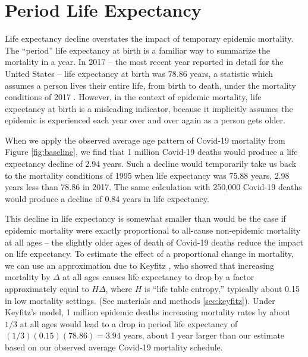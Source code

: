 \documentclass[9pt,twocolumn,twoside,lineno]{pnas-new}
\begin{document}
\section*{Period Life Expectancy}

Life expectancy decline overstates the impact of temporary epidemic
mortality. The ``period'' life expectancy at birth is a familiar way to
summarize the mortality in a year. In 2017 -- the most recent year
reported in detail for the United States -- life expectancy at birth was 78.86
years, a statistic which assumes a person lives their entire life,
from birth to death, under the mortality conditions of 2017
\cite{HMD}. However, in the context of epidemic mortality, life expectancy at
birth is a misleading indicator, because it implicitly assumes the
epidemic is experienced each year over and over again as a person gets
older.

When we apply the observed average age pattern of Covid-19
mortality from Figure \ref{fig:baseline}, we find that 1 million
Covid-19 deaths would produce a life expectancy decline of 2.94 years. 
Such a decline would temporarily take 
us back to the mortality conditions of 1995 when life expectancy was 
75.88 years, 2.98 years less than 78.86 in 2017. The same calculation 
with 250,000 Covid-19 deaths would produce a decline of 0.84 years in life expectancy.

This decline in life expectancy is somewhat smaller than would be the
case if epidemic mortality were exactly proportional to all-cause
non-epidemic mortality at all ages -- the slightly older ages of death
of Covid-19 deaths reduce the impact on life expectancy. To estimate
the effect of a proportional change in mortality, we can use an
approximation due to Keyfitz \cite{keyfitz:1977}, who showed that
increasing mortality by $\Delta$ at all ages causes life expectancy to
drop by a factor approximately equal to $H \Delta $, where $H$ is
``life table entropy,'' typically about 0.15 in low mortality
settings. (See materials and methods \ref{sec:keyfitz}). Under Keyfitz's model, 1
million epidemic deaths increasing mortality rates by about $1/3$ at
all ages would lead to a drop in period life expectancy of
$(1/3) (0.15)(78.86) = 3.94$ years, about 1 year larger than our
estimate based on our observed average Covid-19 mortality schedule.
\end{document}
